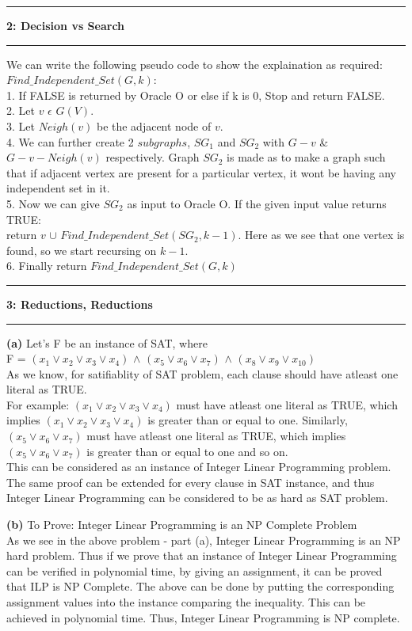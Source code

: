 \documentclass[11pt]{article}
\newcommand\question[2]{\vspace{.25in}\hrule\textbf{#1: #2}\vspace{.5em}\hrule\vspace{.10in}}
\renewcommand\part[1]{\vspace{.10in}\textbf{(#1)}}
\begin{document}
\question{2}{Decision vs Search}
We can write the following pseudo code to show the explaination as required:\\
$Find\_Independent\_Set(G,k)$:\\
1. If FALSE is returned by Oracle O or else if k is 0, Stop and return FALSE.\\
2. Let $v$ $\epsilon$ $G(V)$.\\
3. Let $Neigh(v)$ be the adjacent node of $v$.\\
4. We can further create 2 $subgraphs$, $SG_1$ and $SG_2$ with $G - v$ \& $G - v - Neigh(v)$ respectively. Graph $SG_2$ is made as to make a graph such that if adjacent vertex are present for a particular vertex, it wont be having any independent set in it.\\
5. Now we can give $SG_2$ as input to Oracle O. If the given input value returns TRUE:\\
return $v$ $\cup$ $Find\_Independent\_Set(SG_2,k-1)$. Here as we see that one vertex is found, so we start recursing on $k-1$.\\
6. Finally return $Find\_Independent\_Set(G,k)$   

\question{3}{Reductions, Reductions}
 
\part{a}
Let's F be an instance of SAT, where\\
F = $(x_{1} \lor x_{2} \lor x_{3} \lor x_{4})$ $\land$ $(x_{5} \lor x_{6} \lor x_{7})$ $\land$ $(x_{8} \lor x_{9} \lor x_{10})$\\
As we know, for satifiablity of SAT problem, each clause should have atleast one literal as TRUE.\\
For example: $(x_{1} \lor x_{2} \lor x_{3} \lor x_{4})$ must have atleast one literal as TRUE, which implies $(x_{1} \lor x_{2} \lor x_{3} \lor x_{4})$ is greater than or equal to one. Similarly, $(x_{5} \lor x_{6} \lor x_{7})$ must have atleast one literal as TRUE, which implies $(x_{5} \lor x_{6} \lor x_{7})$ is greater than or equal to one and so on.\\
This can be considered as an instance of Integer Linear Programming problem. The same proof can be extended for every clause in SAT instance, and thus Integer Linear Programming can be considered to be as hard as SAT problem. 

\part{b}
To Prove: Integer Linear Programming is an NP Complete Problem\\
As we see in the above problem - part (a), Integer Linear Programming is an NP hard problem. Thus if we prove that an instance of Integer Linear Programming can be verified in polynomial time, by giving an assignment, it can be proved that ILP is NP Complete. The above can be done by putting the corresponding assignment values into the instance comparing the inequality. This can be achieved in polynomial time. Thus, Integer Linear Programming is NP complete.
\end{document}

